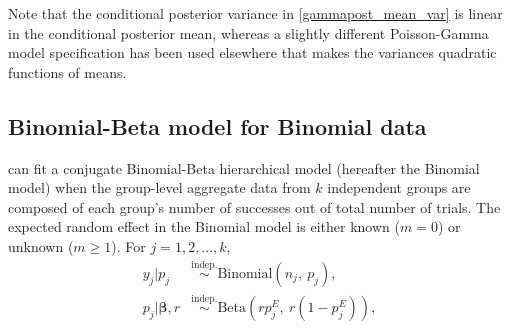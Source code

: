\documentclass[article]{jss}
\begin{document}
Note that the conditional posterior variance in  \eqref{gammapost_mean_var} is linear in the conditional posterior mean, whereas a slightly different Poisson-Gamma model specification has been used elsewhere \citep{morris1997} that makes the variances  quadratic functions of means.  


\subsection[Binomial-Beta]{Binomial-Beta model for Binomial data}
 can fit a conjugate Binomial-Beta hierarchical model (hereafter the Binomial model) when the group-level aggregate data from $k$ independent  groups are composed of each group's number of successes out of total number of trials. The expected random effect in the Binomial model is either known ($m=0$) or unknown ($m\ge1$). For $j=1, 2, \ldots, k$,
\begin{align}
y_{j} \vert p_{j} &\stackrel{\textrm{indep.}}{\sim} \textrm{Binomial}(n_{j}, ~p_{j}),\\
p_{j} \vert \boldsymbol{\beta}, r &\stackrel{\textrm{indep.}}{\sim} \textrm{Beta}(rp^E_j,~ r(1-p^E_j)),
\end{align}
\end{document}
